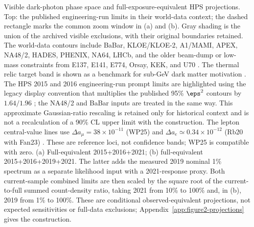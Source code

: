 Visible dark-photon phase space and full-exposure-equivalent HPS projections.
Top: the published engineering-run limits in their world-data context; the dashed
rectangle marks the common zoom window in (a) and (b). Gray shading is the union
of the archived visible exclusions, with their original boundaries retained. The world-data contours include BaBar, KLOE/KLOE-2, A1/MAMI,
APEX, NA48/2, HADES, PHENIX, NA64, LHCb, and the older beam-dump or low-mass
constraints from E137, E141, E774, Orsay, KEK, and U70
\cite{BaBarDarkPhoton2014,KLOE2013,KLOE22015,A1MAMI2014,APEX2011,
NA48DarkPhoton2015,HADESDarkPhoton2014,PHENIXDarkPhoton2015,NA64DarkPhoton2018,
NA64X17Visible2021,LHCbDarkPhoton2020,E137BeamDump1988,E141BeamDump1987,
E774BeamDump1991,OrsayBeamDump1989,KEKBeamDump1986,U70DarkPhoton2014}. The thermal
relic target band is shown as a benchmark for sub-GeV dark matter motivation
\cite{EssigEtAl2011}. The HPS 2015 and 2016 engineering-run prompt limits are
highlighted using the legacy display convention that multiplies the published 95\%
$\eps^2$ contours by $1.64/1.96$ \cite{HPS2015DarkPhoton,HPS2016PromptLong}; the
NA48/2 and BaBar inputs are treated in the same way. This approximate Gaussian-ratio
rescaling is retained only for historical context and is not a recalculation of a
90\% CL upper limit with the \CLs{} construction. The lepton central-value lines use $\Delta a_\mu=38\times10^{-11}$
(WP25) and $\Delta a_e\simeq0.34\times10^{-12}$ (Rb20 with Fan23)
\cite{MuonWP2025,ElectronFan2023,AlphaMorel2020}. These are reference loci,
not confidence bands; WP25 is compatible with zero.
(a) Full-equivalent 2015+2016+2021; (b) full-equivalent 2015+2016+2019+2021.
The latter adds the measured 2019 nominal 1\% spectrum as a separate likelihood
input with a 2021-response proxy. Both current-sample combined limits are then scaled by the square root
of the current-to-full summed count-density ratio, taking 2021 from 10\% to
100\% and, in (b), 2019 from 1\% to 100\%. These are conditional
observed-equivalent projections, not expected sensitivities or full-data
exclusions; Appendix~\ref{app:figure2-projections} gives the construction.
